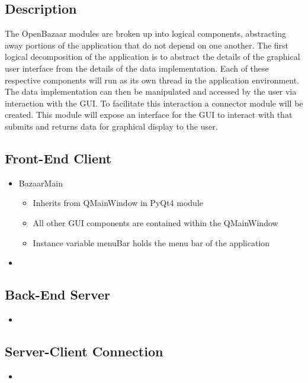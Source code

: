 \documentclass{article}
\begin{document}
\subsection*{Description}
The OpenBazaar modules are broken up into logical components, abstracting away portions of the application that do not depend on one another. The first logical decomposition of the application is to abstract the details of the graphical user interface from the details of the data implementation. Each of these respective components will run as its own thread in the application environment. The data implementation can then be manipulated and accessed by the user via interaction with the GUI. To facilitate this interaction a connector module will be created. This module will expose an interface for the GUI to interact with that submits and returns data for graphical display to the user.

\subsection*{Front-End Client}
\begin{itemize}
\item
BazaarMain

\begin{itemize}
\item
Inherits from QMainWindow in PyQt4 module

\item
All other GUI components are contained within the QMainWindow

\item
Instance variable menuBar holds the menu bar of the application
\end{itemize}

\item
\end{itemize}


\subsection*{Back-End Server}
\begin{itemize}
\item

\end{itemize}

\subsection*{Server-Client Connection}
\begin{itemize}
\item

\end{itemize}
\end{document}
